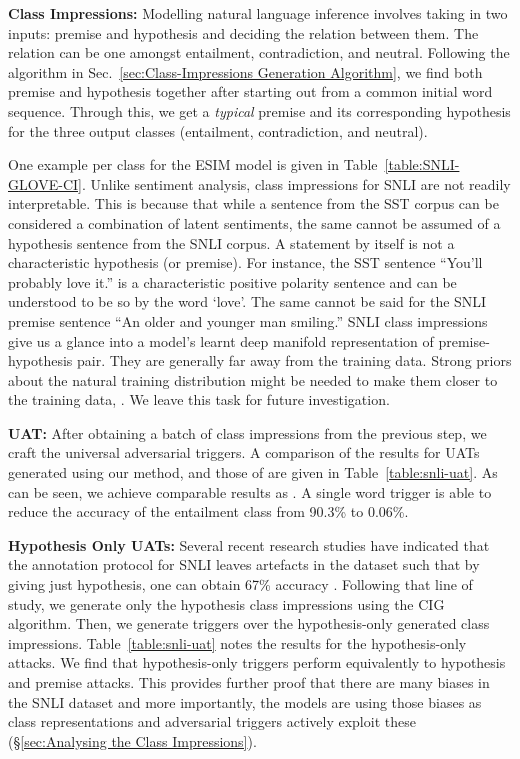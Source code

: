 \noindent\textbf{Class Impressions:} Modelling natural language inference involves taking in two inputs: premise and hypothesis and deciding the relation between them. The relation can be one amongst entailment, contradiction, and neutral. Following the algorithm in Sec.~\ref{sec:Class-Impressions Generation Algorithm}, we find both premise and hypothesis together after starting out from a common initial word sequence. Through this, we get a \emph{typical} premise and its corresponding hypothesis for the three output classes (entailment, contradiction, and neutral). 

One example per class for the ESIM model is given in Table~\ref{table:SNLI-GLOVE-CI}. Unlike sentiment analysis, class impressions for SNLI are not readily interpretable. This is because that while a sentence from the SST corpus can be considered a combination of latent sentiments, the same cannot be assumed of a hypothesis sentence from the SNLI corpus. A statement by itself is not a characteristic hypothesis (or premise). For instance, the SST sentence ``You'll probably love it.'' is a characteristic positive polarity sentence and can be understood to be so by the word `love'. The same cannot be said for the SNLI premise sentence ``An older and younger man smiling.'' SNLI class impressions give us a glance into a model's learnt deep manifold representation of premise-hypothesis pair. They are generally far away from the training data. Strong priors about the natural training distribution might be needed to make them closer to the training data, . We leave this task for future investigation. 






\textbf{UAT:} After obtaining a batch of class impressions from the previous step, we craft the universal adversarial triggers. A comparison of the results for UATs generated using our method, and those of \cite{wallace2019universal} are given in Table~\ref{table:snli-uat}. As can be seen, we achieve comparable results as \cite{wallace2019universal}. A single word trigger is able to reduce the accuracy of the entailment class from 90.3\% to 0.06\%.

\textbf{Hypothesis Only UATs:} Several recent research studies have indicated that the annotation protocol for SNLI leaves artefacts in the dataset such that by giving just hypothesis, one can obtain 67\% accuracy \cite{gururangan2018annotation,poliak2018hypothesis}. Following that line of study, we generate only the hypothesis class impressions using the CIG algorithm. Then, we generate triggers over the hypothesis-only generated class impressions. Table~\ref{table:snli-uat} notes the results for the hypothesis-only attacks. We find that hypothesis-only triggers perform equivalently to hypothesis and premise attacks. This provides further proof that there are many biases in the SNLI dataset and more importantly, the models are using those biases as class representations and adversarial triggers actively exploit these (\S\ref{sec:Analysing the Class Impressions}).

